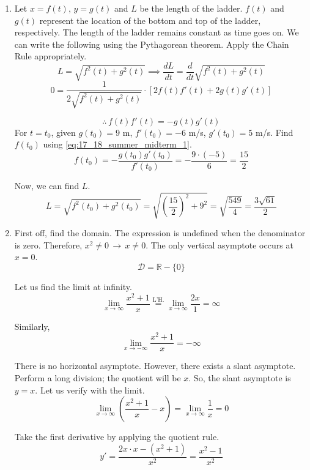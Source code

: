\documentclass[a4paper, 12pt]{article}
\begin{document}
\begin{enumerate}[leftmargin=*,label=\textbf{\arabic*.}]
$\boxed{b=3}$, so $a+3 = 3\rightarrow \boxed{a = 0}$.

\textbf{Remark}: Condition $f(2) + 3 = f(0)$ is redundant because we already found the values of $a$ and $b$. It does not provide any further useful information, and it is unknown why it was included in the question.

\item Let $x = f(t), \,y = g(t)$ and $L$ be the length of the ladder. $f(t)$ and $g(t)$ represent the location of the bottom and top of the ladder, respectively. The length of the ladder remains constant as time goes on. We can write the following using the Pythagorean theorem. Apply the Chain Rule appropriately.
\[L = \sqrt{f^2(t) + g^2(t)}\implies\frac{dL}{dt} = \frac{d}{dt}\sqrt{f^2(t) + g^2(t)}\]
\[0 = \frac{1}{2\sqrt{f^2(t)+g^2(t)}} \cdot [2f(t)f'(t) + 2g(t)g'(t)]\]

\begin{equation}\therefore \, f(t)f'(t) = -g(t)g'(t)\label{eq:17_18_summer_midterm_1}\end{equation}
For $t=t_0$, given $g(t_0) = 9$ m, $f'(t_0) = -6$ m/s, $g'(t_0) = 5$ m/s. Find $f(t_0)$ using \eqref{eq:17_18_summer_midterm_1}.
\[f(t_0) = -\frac{g(t_0)g'(t_0)}{f'(t_0)} = -\frac{9\cdot (-5)}{6} = \frac{15}{2}\]

Now, we can find $L$.
\[L =\sqrt{f^2(t_0) + g^2(t_0)} = \sqrt{\left(\frac{15}{2}\right)^2 + 9^2} = \sqrt{\frac{549}{4}}=\boxed{\frac{3\sqrt{61}}{2}}\]

\item First off, find the domain. The expression is undefined when the denominator is zero. Therefore, $x^2 \neq 0 \,\rightarrow\, x\neq0$. The only vertical asymptote occurs at $x = 0$.
\[\mathcal{D} = \mathbb{R} - \{0\} \]

Let us find the limit at infinity.
\[\lim_{x\to \infty} \frac{x^2+1}{x} \overset{\text{L'H.}}{=} \lim_{x\to \infty} \frac{2x}{1} = \infty\]

Similarly,
\[\lim_{x\to -\infty} \frac{x^2+ 1}{x} = -\infty\]

There is no horizontal asymptote. However, there exists a slant asymptote. Perform a long division; the quotient will be $x$. So, the slant asymptote is $y=x$. Let us verify with the limit.
\[\lim_{x\to\infty} \left(\frac{x^2+1}{x} - x\right) = \lim_{x\to\infty} \frac{1}{x} = 0\]

Take the first derivative by applying the quotient rule.
\[y' = \frac{2x\cdot x - (x^2+1)}{x^2}=\frac{x^2-1}{x^2}\]


\end{enumerate}
\end{document}

